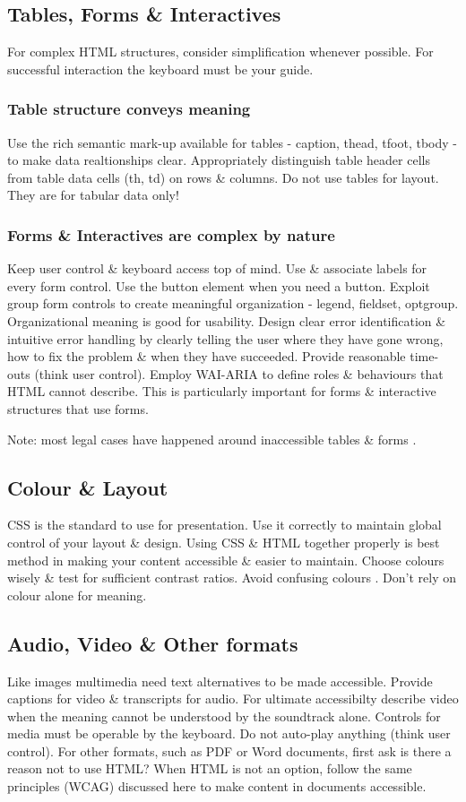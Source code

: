 \documentclass{acm_proc_article-sp}
\begin{document}
\subsection{Tables, Forms \& Interactives}
For complex HTML structures, consider simplification whenever possible. For successful interaction the keyboard must be your guide.
\subsubsection{Table structure conveys meaning}
Use the rich semantic mark-up available for tables - caption, thead, tfoot, tbody - to make data realtionships clear. Appropriately distinguish table header cells from table data cells (th, td) on rows \& columns. Do not use tables for layout. They are for tabular data only!
\subsubsection{Forms \& Interactives are complex by nature}
Keep user control \& keyboard access top of mind. Use \& associate labels for every form control. Use the button element when you need a button. Exploit group form controls to create meaningful organization - legend, fieldset, optgroup. Organizational meaning is good for usability. Design clear error identification \& intuitive error handling by clearly telling the user where they have gone wrong, how to fix the problem \& when they have succeeded. Provide reasonable time-outs (think user control). Employ WAI-ARIA \cite{horton:w4e} to define roles \& behaviours that HTML cannot describe. This is particularly important for forms \& interactive structures that use forms.

Note: most legal cases have happened around inaccessible tables \& forms \cite{monsebraaten:victory}.

\subsection{Colour \& Layout}
CSS is the standard to use for presentation. Use it correctly to maintain global control of your layout \& design. Using CSS \& HTML together properly is best method in making your content accessible \& easier to maintain. Choose colours wisely \& test for sufficient contrast ratios. Avoid confusing colours \cite{brewer:pal}. Don't rely on colour alone for meaning.

\subsection{Audio, Video \& Other formats}
Like images multimedia need text alternatives to be made accessible. Provide captions for video \& transcripts for audio. For ultimate accessibilty describe video when the meaning cannot be understood by the soundtrack alone. Controls for media must be operable by the keyboard. Do not auto-play anything \cite{wcagsam} (think user control). For other formats, such as PDF or Word documents, first ask is there a reason not to use HTML? When HTML is not an option, follow the same principles (WCAG) discussed here to make content in documents accessible.
\end{document}

